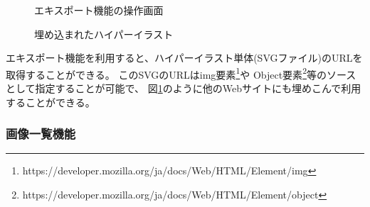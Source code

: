 \begin{figure}[htbp] \begin{minipage}{0.5\hsize}
                         \begin{center} 
                         \end{center} \caption{エキスポート機能の操作画面} \label{fig:exporting1}
\end{minipage} \begin{minipage}{0.5\hsize}
                   \begin{center} 
                   \end{center} \caption{埋め込まれたハイパーイラスト} \label{fig:exporting2}
\end{minipage}
\end{figure}
エキスポート機能を利用すると、ハイパーイラスト単体(SVGファイル)のURLを取得することができる。
このSVGのURLはimg要素\footnote{https://developer.mozilla.org/ja/docs/Web/HTML/Element/img}や
Object要素\footnote{https://developer.mozilla.org/ja/docs/Web/HTML/Element/object}等のソースとして指定することが可能で、
図\ref{fig:exporting2}のように他のWebサイトにも埋めこんで利用することができる。

\subsubsection{画像一覧機能}

